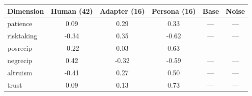 \begin{tabular}{lccccc}
\toprule
Dimension & Human (42) & Adapter (16) & Persona (16) & Base & Noise \\
\midrule
patience & 0.09 & 0.29 & 0.33 & --- & --- \\
risktaking & -0.34 & 0.35 & -0.62 & --- & --- \\
posrecip & -0.22 & 0.03 & 0.63 & --- & --- \\
negrecip & 0.42 & -0.32 & -0.59 & --- & --- \\
altruism & -0.41 & 0.27 & 0.50 & --- & --- \\
trust & 0.09 & 0.13 & 0.73 & --- & --- \\
\bottomrule
\end{tabular}
